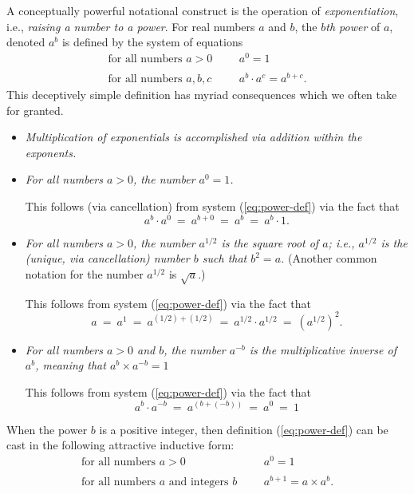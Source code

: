 A conceptually powerful notational construct is the operation of {\it
  exponentiation}, 
i.e., {\it raising a number to a power}.
For real numbers $a$ and $b$, the {\it $b$th power} of $a$, denoted
$a^b$ is defined by the system of equations
\begin{equation}
\label{eq:power-def}
\begin{array}{llll}
\mbox{for all numbers $a>0$} & & & a^0 = 1 \\
 & & & \\
\mbox{for all numbers $a, b, c$} & & & a^b \cdot a^c = a^{b+c}.
\end{array}
\end{equation}
This deceptively simple definition has myriad consequences which we
often take for granted.
\begin{itemize}
\item
{\em Multiplication of exponentials is accomplished via addition
  within the exponents.}

\item
{\em For all numbers $a>0$, the number $a^0 = 1$.}

This follows (via cancellation) from system (\ref{eq:power-def}) via
the fact that
\[ a^b \cdot a^0 \ = \ a^{b+0} \ = \ a^b \ = \ a^b \cdot 1.  \]

\item
{\em For all numbers $a >0$, the number $a^{1/2}$
is the {\it square root} of $a$; i.e., $a^{1/2}$ is
the (unique, via cancellation) number $b$ such that $b^2 = a$.}
(Another common notation for the number $a^{1/2}$ is
$\sqrt{a}$.)

This follows from system (\ref{eq:power-def}) via the fact that
\[ a \ = \ a^1 \ = \ a^{(1/2) + (1/2)} \ = \ a^{1/2} \cdot a^{1/2} \ = \
\left(a^{1/2}\right)^2. \]

\item
{\em For all numbers $a>0$ and $b$, the number $a^{-b}$ is the {\it
    multiplicative inverse} of $a^b$, meaning that $a^b \times a^{-b}
  = 1$}

This follows from system (\ref{eq:power-def}) via the fact that
\[ a^b \cdot a^{-b} \ = \ a^{(b + (-b))} \ = \ a^0 \ = \  1 \]
\end{itemize}
When the power $b$ is a positive integer, then definition
(\ref{eq:power-def}) can be cast in the following attractive inductive
form:
\begin{equation}
\label{eq:power-def-integer}
\begin{array}{llll}
\mbox{for all numbers $a>0$} & & & a^0 = 1 \\
 & & & \\
\mbox{for all numbers $a$ and integers $b$} & & & a^{b+1} = a \times
a^b.
\end{array}
\end{equation}

